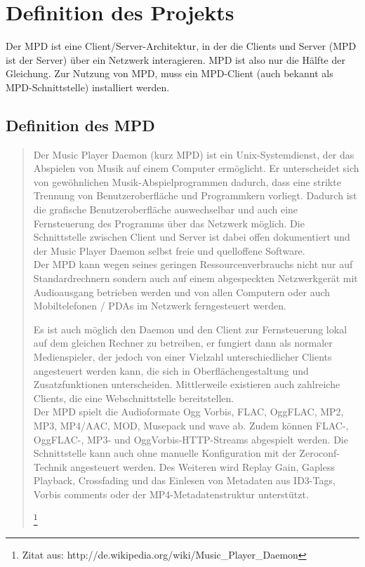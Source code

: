 \chapter{Definition des Projekts}
Der MPD ist eine Client/Server-Architektur, in der die Clients und Server (MPD ist der Server) über ein Netzwerk interagieren. MPD ist also nur die Hälfte der Gleichung. Zur Nutzung von MPD, muss ein MPD-Client (auch bekannt als MPD-Schnittstelle) installiert werden.
\section{Definition des MPD}

\begin{quote}
Der Music Player Daemon (kurz MPD) ist ein Unix-Systemdienst, der das Abspielen von Musik auf einem Computer ermöglicht. Er unterscheidet sich von gewöhnlichen Musik-Abspielprogrammen dadurch, dass eine strikte Trennung von Benutzeroberfläche und Programmkern vorliegt. Dadurch ist die grafische Benutzeroberfläche auswechselbar und auch eine Fernsteuerung des Programms über das Netzwerk möglich. Die Schnittstelle zwischen Client und Server ist dabei offen dokumentiert und der Music Player Daemon selbst freie und quelloffene Software.\\

Der MPD kann wegen seines geringen Ressourcenverbrauchs nicht nur auf Standardrechnern sondern auch auf einem abgespeckten Netzwerkgerät mit Audioausgang betrieben werden und von allen Computern oder auch Mobiltelefonen / PDAs im Netzwerk ferngesteuert werden.

Es ist auch möglich den Daemon und den Client zur Fernsteuerung lokal auf dem gleichen Rechner zu betreiben, er fungiert dann als normaler Medienspieler, der jedoch von einer Vielzahl unterschiedlicher Clients angesteuert werden kann, die sich in Oberflächengestaltung und Zusatzfunktionen unterscheiden. Mittlerweile existieren auch zahlreiche Clients, die eine Webschnittstelle bereitstellen.\\

Der MPD spielt die Audioformate Ogg Vorbis, FLAC, OggFLAC, MP2, MP3, MP4/AAC, MOD, Musepack und wave ab. Zudem können FLAC-, OggFLAC-, MP3- und OggVorbis-HTTP-Streams abgespielt werden. Die Schnittstelle kann auch ohne manuelle Konfiguration mit der Zeroconf-Technik angesteuert werden. Des Weiteren wird Replay Gain, Gapless Playback, Crossfading und das Einlesen von Metadaten aus ID3-Tags, Vorbis comments oder der MP4-Metadatenstruktur unterstützt.

\footnote{Zitat aus: http://de.wikipedia.org/wiki/Music\_Player\_Daemon}
\end{quote}

